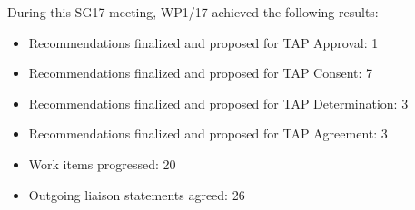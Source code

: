During this SG17 meeting, WP1/17 achieved the following results:

\begin{itemize}
  \item Recommendations finalized and proposed for TAP Approval: 1
  \item Recommendations finalized and proposed for TAP Consent: 7
  \item Recommendations finalized and proposed for TAP Determination: 3
  \item Recommendations finalized and proposed for TAP Agreement: 3
  \item Work items progressed: 20
  \item Outgoing liaison statements agreed: 26
\end{itemize}